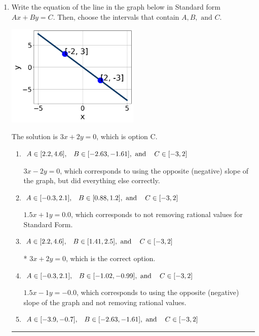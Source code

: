 \documentclass{extbook}[14pt]
\newcommand{\litem}[1]{\item #1

\rule{\textwidth}{0.4pt}}
\begin{document}
\begin{enumerate}\litem{
Write the equation of the line in the graph below in Standard form $Ax+By=C$. Then, choose the intervals that contain $A, B, \text{ and } C$.

\begin{center}
    \includegraphics[width=0.5\textwidth]{../Figures/linearGraphToStandardC.png}
\end{center}




The solution is \( 3x + 2y = 0 \), which is option C.\begin{enumerate}[label=\Alph*.]
\item \( A \in [2.2, 4.6], \hspace{3mm} B \in [-2.63, -1.61], \text{ and } \hspace{3mm} C \in [-3, 2] \)

 $3x - 2y = 0$, which corresponds to using the opposite (negative) slope of the graph, but did everything else correctly.
\item \( A \in [-0.3, 2.1], \hspace{3mm} B \in [0.88, 1.2], \text{ and } \hspace{3mm} C \in [-3, 2] \)

 $1.5x + 1y = 0.0$, which corresponds to not removing rational values for Standard Form.
\item \( A \in [2.2, 4.6], \hspace{3mm} B \in [1.41, 2.5], \text{ and } \hspace{3mm} C \in [-3, 2] \)

* $3x + 2y = 0$, which is the correct option.
\item \( A \in [-0.3, 2.1], \hspace{3mm} B \in [-1.02, -0.99], \text{ and } \hspace{3mm} C \in [-3, 2] \)

 $1.5x - 1y = -0.0$, which corresponds to using the opposite (negative) slope of the graph and not removing rational values.
\item \( A \in [-3.9, -0.7], \hspace{3mm} B \in [-2.63, -1.61], \text{ and } \hspace{3mm} C \in [-3, 2] \)


\end{enumerate}}
\end{enumerate}
\end{document}
